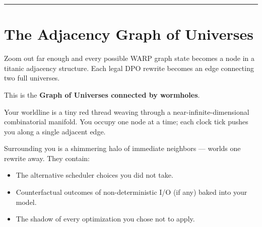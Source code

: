 \begin{center}
\end{center}

\begin{center}\rule{0.5\linewidth}{0.5pt}\end{center}

\section{The Adjacency Graph of Universes}
\label{7.2-adjacency-graph}

Zoom out far enough and every possible WARP graph state becomes a node in a titanic adjacency structure. Each legal DPO rewrite becomes an edge connecting two full universes.

This is the \textbf{Graph of Universes connected by wormholes}.

Your worldline is a tiny red thread weaving through a near-infinite-dimensional combinatorial manifold. You occupy one node at a time; each clock tick pushes you along a single adjacent edge.

Surrounding you is a shimmering halo of immediate neighbors --- worlds one rewrite away. They contain:

\begin{itemize}
    \item The alternative scheduler choices you did not take.
    \item Counterfactual outcomes of non-deterministic I/O (if any) baked into your model.
    \item The shadow of every optimization you chose not to apply.
\end{itemize}

